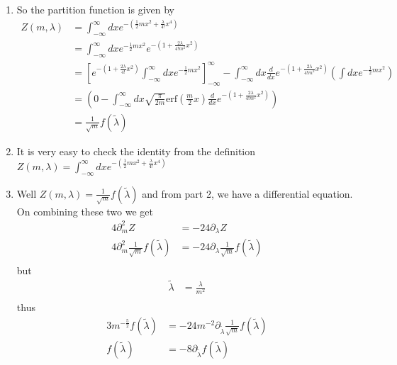 \documentclass[12pt,letterpaper,reqno]{article}
\numberwithin{equation}{section}
\begin{document}
\begin{solution}
  \begin{enumerate}
  \item So the partition function is given by
    \begin{equation}
      \begin{split}
      Z(m,\lambda) &= \int_{-\infty}^{\infty} dx e^{-\left(\frac{1}{2}mx^2+\frac{\lambda}{4!}x^4\right)}\\
      &= \int_{-\infty}^{\infty} dx e^{-\frac{1}{2}mx^2}e^{-\left(1+\frac{2\lambda}{4!m^2}x^2\right)}\\
      &= \left[e^{-\left(1+\frac{2\lambda}{4!}x^2\right)}\int_{-\infty}^{\infty} dx e^{-\frac{1}{2}mx^2}\right]_{-\infty}^{\infty}-\int_{-\infty}^{\infty} dx \frac{d}{dx}e^{-\left(1+\frac{2\lambda}{4!m^2}x^2\right)}\left(\int dx e^{-\frac{1}{2}mx^2}\right)\\
      &= \left(0-\int_{-\infty}^{\infty} dx\sqrt{\frac{\pi}{2m}}\text{erf}\left(\frac{m}{2}x\right) \frac{d}{dx}e^{-\left(1+\frac{2\lambda}{4!m^2}x^2\right)}\right)\\
      &= \frac{1}{\sqrt{m}}f(\tilde{\lambda})
      \end{split}
    \end{equation}
    \item It is very easy to check the identity from the definition $Z(m,\lambda) = \int_{-\infty}^{\infty} dx e^{-\left(\frac{1}{2}mx^2+\frac{\lambda}{4!}x^4\right)}$
    \item Well $Z(m,\lambda)=\frac{1}{\sqrt{m}}f(\tilde{\lambda})$ and from part 2, we have a differential equation.  On combining these two we get
      \begin{equation}
        \begin{split}
          4\partial^2_mZ &= -24\partial_\lambda Z\\
          4\partial^2_m\frac{1}{\sqrt{m}}f(\tilde{\lambda}) &= -24\partial_\lambda \frac{1}{\sqrt{m}}f(\tilde{\lambda})\\
        \end{split}
      \end{equation}
but 
\begin{equation}
  \begin{split}
    \tilde{\lambda} &= \frac{\lambda}{m^2}\\
  \end{split}
\end{equation}
thus
\begin{equation}
        \begin{split}
          3m^{-\frac{5}{2}}f(\tilde{\lambda}) &= -24m^{-2}\partial_{\tilde{\lambda}} \frac{1}{\sqrt{m}}f(\tilde{\lambda})\\
f(\tilde{\lambda}) &= -8\partial_{\tilde{\lambda}}f(\tilde{\lambda})
        \end{split}
      \end{equation}
  \end{enumerate}
\end{solution}
\end{document}
